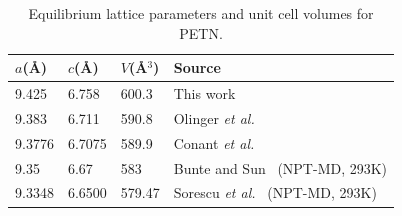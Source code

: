 \documentclass[prb,aps,nobibnotes,twocolumn,doublespace,twocolumngrid,superbib]{revtex4}
\begin{document}
 


\begin{table}[p]
\begin{center}
\begin{tabular}{llll}
\hline\hline
$a$(\AA) & $c$(\AA) & $V$(\AA$^3$) & Source \\
\hline
9.425  & 6.758  &  600.3  & This work \\
9.383  & 6.711  &  590.8  & Olinger {\it et al.}~\cite{Olinger_1975v62}\\
9.3776 & 6.7075 &  589.9  & Conant {\it et al.}~\cite{Conant_1979} \\
9.35   & 6.67   &  583    & Bunte and Sun~\cite{Bunte_2000v104} (NPT-MD, 293K) \\
9.3348 & 6.6500 &  579.47 & Sorescu {\it et al.}~\cite{Sorescu_1999v103} (NPT-MD, 293K) \\
\hline\hline
\end{tabular}
\end{center}
\caption{Equilibrium lattice parameters and unit cell volumes for PETN.
}
\label{tab:table1}
\end{table}
\end{document}
